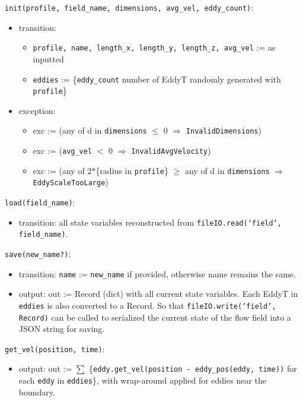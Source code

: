 \documentclass[12pt, titlepage]{article}
\begin{document}
\noindent \texttt{init(profile, field\_name, dimensions, avg\_vel, eddy\_count)}:
\begin{itemize}
\item transition: 
  \begin{itemize}
    \item \texttt{profile, name, length\_x, length\_y, length\_z, avg\_vel} := as inputted
    \item \texttt{eddies} := \{\texttt{eddy\_count} number of EddyT randomly generated with \texttt{profile}\}
  \end{itemize}
\item exception: 
  \begin{itemize}
    \item exc := (any of d in \texttt{dimensions} $\le$ 0 $\Rightarrow$ \texttt{InvalidDimensions})
    \item exc := (\texttt{avg\_vel} $<$ 0 $\Rightarrow$ \texttt{InvalidAvgVelocity})
    \item exc := (any of 2$*$\{radius in \texttt{profile}\} $\ge$ any of d in \texttt{dimensions} $\Rightarrow$ \texttt{EddyScaleTooLarge})
  \end{itemize}
\end{itemize}

\noindent \texttt{load(field\_name)}:
\begin{itemize}
  \item transition: all state variables reconstructed from \texttt{fileIO.read(`field', field\_name)}.
\end{itemize}

\noindent \texttt{save(new\_name?)}:
\begin{itemize}
  \item transition: \texttt{name} := \texttt{new\_name} if provided, otherwise name remains the same.
  \item output: out := Record (dict) with all current state variables. Each EddyT in \texttt{eddies} is also converted to a Record. So that \texttt{fileIO.write(`field', Record)} can be called to serialized the current state of the flow field into a JSON string for saving.
\end{itemize}

\noindent \texttt{get\_vel(position, time)}:
\begin{itemize}
  \item output: out := $\sum$ \{\texttt{eddy.get\_vel(position - eddy\_pos(eddy, time))} for each \texttt{eddy} in \texttt{eddies}\}, with wrap-around applied for eddies near the boundary.
\end{itemize}
\end{document}
